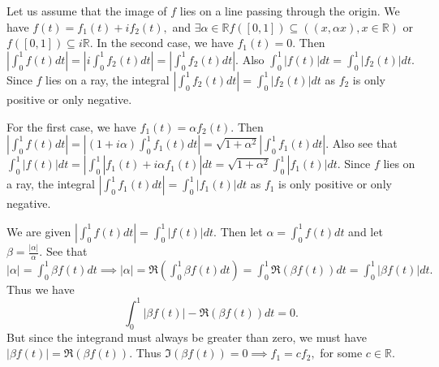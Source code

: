 \documentclass{article}
\begin{document}
\section{} %
Let us assume that the image of $f$ lies on a line passing through the origin. We have $f(t)=f_1(t)+if_2(t),$ and $\exists \alpha \in \mathbb{R} 
f([0,1])\subseteq ((x,\alpha x), x \in \mathbb{R})$ or $f([0,1]) \subseteq i\mathbb{R}.$ In the second case, we have $f_1(t)=0.$ Then 
$|\int_{0}^1f(t)dt| = |i\int_{0}^1f_2(t)dt| = |\int_{0}^1f_2(t)dt|.$ Also $\int_{0}^1 |f(t)|dt= \int_{0}^1 |f_2(t)|dt.$ Since $f$ lies on a ray, the 
integral $|\int_{0}^1 f_2(t)dt|= \int_{0}^1 |f_2(t)|dt$ as $f_2$ is only positive or only negative.

For the first case, we have $f_1(t)=\alpha f_2(t).$ Then $|\int_{0}^1 f(t)dt| = |(1+i\alpha)\int_{0}^1 f_1(t)dt| = 
\sqrt{1+\alpha^2}|\int_{0}^1 f_1(t)dt|.$ Also see that $\int_{0}^1 |f(t)|dt= |\int_{0}^1 |f_1(t)+i\alpha f_1(t)| dt = \sqrt{1+\alpha^2} 
\int_{0}^1 |f_1(t)|dt.$ Since $f$ lies on a ray, the integral $|\int_{0}^1 f_1(t)dt|= \int_{0}^1 |f_1(t)|dt$ as $f_1$ is only positive or only negative.

We are given $\left| \int_{0}^1 f(t)dt\right|= \int_{0}^1 |f(t)|dt.$ Then let $\alpha= \int_{0}^1 f(t)dt$ and let $\beta = \frac{|\alpha|}{\alpha}.$ See 
that $|\alpha| = \int_{0}^1 \beta f(t)dt \implies |\alpha| = \Re \left(\int_{0}^1 \beta f(t)dt\right)= \int_{0}^1 \Re(\beta f(t))dt= \int_{0}^1 |\beta 
f(t)|dt.$ Thus we have $$\int_{0}^1  |\beta f(t)| -\Re(\beta f(t))dt=0.$$ But since the integrand must always be greater than zero, we must have  $ |\beta 
f(t)| = \Re(\beta f(t)).$ Thus $\Im(\beta f(t))=0 \implies f_1= c f_2,$ for some $c \in \mathbb{R}.$
\end{document}
